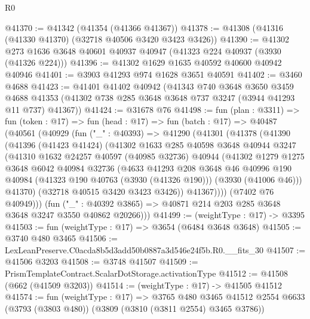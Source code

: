 \begin{lexlean}{R0}
\begin{coremodule}
@41370 := @41342 (@41354 (@41366 @41367))
@41378 := @41308 (@41316 (@41330 @41370) (@32718 @40506 @3420 @3423 @3426))
@41390 := @41302 @273 @1636 @3648 @40601 @40937 @40947 (@41323 @224 @40937 (@3930 (@41326 @224)))
@41396 := @41302 @1629 @1635 @40592 @40600 @40942 @40946
@41401 := @3903 @41293 @974 @1628 @3651 @40591
@41402 := @3460 @4688
@41423 := @41401
    @41402
    @40942
    (@41343
      @740
      @3648
      @3650
      @3459
      @4688
      @41353
      (@41302 @738 @285 @3648 @3648 @737 @3247 (@3944 @41293 @11 @737) @41367))
@41424 := @31678 @76
@41498 := fun (plan : @3311) =>
  fun (token : @17) =>
  fun (head : @17) =>
  fun (batch : @17) =>
  @40487
    (@40561
      (@40929
        (fun ("_" : @40393) =>
        @41290
          (@41301
            (@41378
              (@41390
                (@41396
                  (@41423 @41424)
                  (@41302
                    @1633
                    @285
                    @40598
                    @3648
                    @40944
                    @3247
                    (@41310
                      @1632
                      @24257
                      @40597
                      (@40985 @32736)
                      @40944
                      (@41302
                        @1279
                        @1275
                        @3648
                        @6042
                        @40984
                        @32736
                        (@4633
                          @41293
                          @208
                          @3648
                          @46
                          @40996
                          @190
                          @40984
                          (@41323 @190 @40763 (@3930 (@41326 @190)))
                          (@3930 (@41006 @46)))
                        @41370)
                      (@32718 @40515 @3420 @3423 @3426))
                    @41367))))
            (@7402 @76 @40949)))
        (fun ("_" : @40392 @3865) => @40871 @214 @203 @285 @3648 @3648 @3247 @3550 @40862 @20266)))
@41499 := (weightType : @17) -> @3395
@41503 := fun (weightType : @17) => @3654 (@6484 @3648 @3648)
@41505 := @3740 @480 @3465
@41506 := LexLeanPreserve.C0acda8b5d3add50b0887a3d546e24f5b.R0.__fits_30
@41507 := @41506 @3203
@41508 := @3748 @41507
@41509 := PrismTemplateContract.ScalarDotStorage.activationType
@41512 := @41508 (@662 (@41509 @3203))
@41514 := (weightType : @17) -> @41505 @41512
@41574 := fun (weightType : @17) =>
  @3765
    @480
    @3465
    @41512
    @2554
    @6633
    (@3793 (@3803 @480))
    (@3809 (@3810 (@3811 @2554) @3465 @3786))

\end{coremodule}
\end{lexlean}
